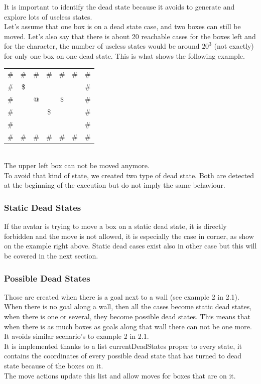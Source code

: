 \documentclass[a4paper,10pt]{article}
\begin{document}
			It is important to identify the dead state because it avoids to generate and explore lots of useless states.\\
			 Let's assume that one box is on a dead state case, and two boxes can still be moved. Let's also say that there is about 20 reachable cases for the boxes left and for the character, the number of useless states would be around $ 20^{3} $ (not exactly) for only one box on one dead state. This is what shows the following example.\\
	\begin{tabular}{ccccccc}
		\# & \# & \# & \# & \# & \# & \# \\ 
		\# & \$ &    &    &    &    & \# \\ 
		\# &    & @  &    & \$ &    & \# \\ 
		\# &    &    & \$ &    &    & \# \\ 
		\# &    &    &    &    &    & \# \\
		\# & \# & \# & \# & \# & \# & \# \\ 
	\end{tabular}\\ 
			The upper left box can not be moved anymore.\\
			To avoid that kind of state, we created two type of dead state. Both are detected at the beginning of the execution but do not imply the same behaviour.
			
			\subsubsection{Static Dead States}
				If the avatar is trying to move a box on a static dead state, it is directly forbidden and the move is not allowed, it is especially the case in corner, as show on the example right above.
				Static dead cases exist also in other case but this will be covered in the next section.
				
			\subsubsection{Possible Dead States}
				Those are created when there is a goal next to a wall (see example 2 in 2.1). When there is no goal along a wall, then all the cases become static dead states, when there is one or several, they become possible dead states. This means that when there is as much boxes as goals along that wall there can not be one more. It avoids similar scenario's to example 2 in 2.1.\\
				It is implemented thanks to a list currentDeadStates proper to every state, it contains the coordinates of every possible dead state that has turned to dead state because of the boxes on it.\\
				The move actions update this list and allow moves for boxes that are on it.				
				
\end{document}
